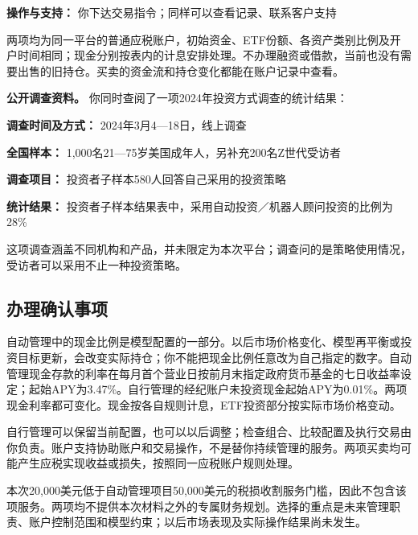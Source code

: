 \documentclass[UTF8,fontset=none,11pt,a4paper]{ctexart}
\begin{document}
\textbf{操作与支持：} 你下达交易指令；同样可以查看记录、联系客户支持


两项均为同一平台的普通应税账户，初始资金、ETF份额、各资产类别比例及开户时间相同；现金分别按表内的计息安排处理。不办理融资或借款，当前也没有需要出售的旧持仓。买卖的资金流和持仓变化都能在账户记录中查看。


\textbf{公开调查资料。} 你同时查阅了一项2024年投资方式调查的统计结果：


\textbf{调查时间及方式：} 2024年3月4—18日，线上调查


\textbf{全国样本：} 1,000名21—75岁美国成年人，另补充200名Z世代受访者


\textbf{调查项目：} 投资者子样本580人回答自己采用的投资策略


\textbf{统计结果：} 投资者子样本结果表中，采用自动投资／机器人顾问投资的比例为28\%


这项调查涵盖不同机构和产品，并未限定为本次平台；调查问的是策略使用情况，受访者可以采用不止一种投资策略。


\subsection*{办理确认事项}
自动管理中的现金比例是模型配置的一部分。以后市场价格变化、模型再平衡或投资目标更新，会改变实际持仓；你不能把现金比例任意改为自己指定的数字。自动管理现金存款的利率在每月首个营业日按前月末指定政府货币基金的七日收益率设定；起始APY为3.47\%。自行管理的经纪账户未投资现金起始APY为0.01\%。两项现金利率都可变化。现金按各自规则计息，ETF投资部分按实际市场价格变动。


自行管理可以保留当前配置，也可以以后调整；检查组合、比较配置及执行交易由你负责。账户支持协助账户和交易操作，不是替你持续管理的服务。两项买卖均可能产生应税实现收益或损失，按照同一应税账户规则处理。


本次20,000美元低于自动管理项目50,000美元的税损收割服务门槛，因此不包含该项服务。两项均不提供本次材料之外的专属财务规划。选择的重点是未来管理职责、账户控制范围和模型约束；以后市场表现及实际操作结果尚未发生。
\end{document}

